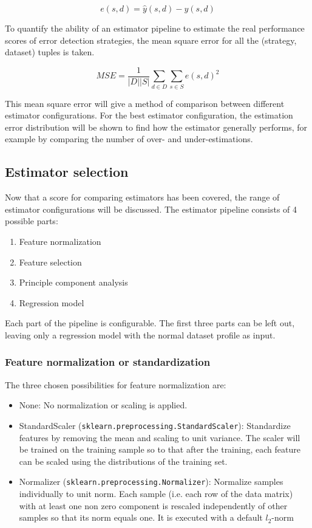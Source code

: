 \begin{equation}
	e(s, d) = \hat{y}(s, d) - y(s, d)
\end{equation}

To quantify the ability of an estimator pipeline to estimate the real performance scores of error detection strategies, the mean square error for all the (strategy, dataset) tuples is taken. 

\begin{equation}
	MSE = \frac{1}{|D||S|} \sum_{d \in D} \sum_{s \in S} e(s, d)^2
\end{equation}

This mean square error will give a method of comparison between different estimator configurations. For the best estimator configuration, the estimation error distribution will be shown to find how the estimator generally performs, for example by comparing the number of over- and under-estimations.

\subsection{Estimator selection}
\label{subsec:estimatorselection}
Now that a score for comparing estimators has been covered, the range of estimator configurations will be discussed.
The estimator pipeline consists of 4 possible parts:
\begin{enumerate}
	\item Feature normalization
	\item Feature selection
	\item Principle component analysis
	\item Regression model
\end{enumerate}

Each part of the pipeline is configurable. The first three parts can be left out, leaving only a regression model with the normal dataset profile as input. 

\subsubsection{Feature normalization or standardization}
The three chosen possibilities for feature normalization are:
\begin{itemize}
	\item None: No normalization or scaling is applied.
	\item StandardScaler (\verb|sklearn.preprocessing.StandardScaler|): Standardize features by removing the mean and scaling to unit variance. The scaler will be trained on the training sample so to that after the training, each feature can be scaled using the distributions of the training set.
	\item Normalizer (\verb|sklearn.preprocessing.Normalizer|): Normalize samples individually to unit norm. Each sample (i.e. each row of the data matrix) with at least one non zero component is rescaled independently of other samples so that its norm equals one. It is executed with a default $l_2$-norm
\end{itemize}


